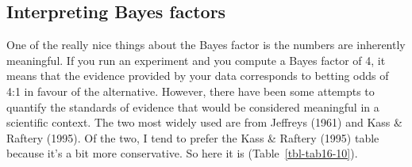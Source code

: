 \documentclass[
  a4paper,
]{book}
\begin{document}
\hypertarget{interpreting-bayes-factors}{%
\subsection{Interpreting Bayes
factors}\label{interpreting-bayes-factors}}

One of the really nice things about the Bayes factor is the numbers are
inherently meaningful. If you run an experiment and you compute a Bayes
factor of 4, it means that the evidence provided by your data
corresponds to betting odds of 4:1 in favour of the alternative.
However, there have been some attempts to quantify the standards of
evidence that would be considered meaningful in a scientific context.
The two most widely used are from Jeffreys (1961) and Kass \& Raftery
(1995). Of the two, I tend to prefer the Kass \& Raftery (1995) table
because it's a bit more conservative. So here it is
(Table~\ref{tbl-tab16-10}).

\hypertarget{tbl-tab16-10}{}
 
  \providecommand{\huxb}[2]{\arrayrulecolor[RGB]{#1}\global\arrayrulewidth=#2pt}
  \providecommand{\huxvb}[2]{\color[RGB]{#1}\vrule width #2pt}
  \providecommand{\huxtpad}[1]{\rule{0pt}{#1}}
  \providecommand{\huxbpad}[1]{\rule[-#1]{0pt}{#1}}
\end{document}
